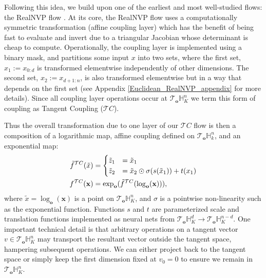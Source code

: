 Following this idea, we build upon one of the earliest and most well-studied flows: the RealNVP flow \cite{dinh2016density}. At its core, the RealNVP flow uses a computationally symmetric transformation (affine coupling layer) which has the benefit of being fast to evaluate and invert due to a triangular Jacobian whose determinant is cheap to compute. Operationally, the coupling layer is implemented using a binary mask, and partitions some input $x$ into two sets, where the first set, $x_1:=x_{0:d}$ is transformed elementwise independently of other dimensions. The second set, $x_2:=x_{d+1:n}$, is also transformed elementwise but in a way that depends on the first set (see Appendix \ref{Euclidean_RealNVP_appendix} for more details). Since all coupling layer operations occur at $\mathcal{T}_{\textbf{o}}\mathbb{H}^n_K$ we term this form of coupling as Tangent Coupling ($\mathcal{T}C$). 

Thus the overall transformation due to one layer of our $\mathcal{T}C$ flow is then a composition of a logarithmic map, affine coupling defined on $\mathcal{T}_{\textbf{o}}\mathbb{H}^n_k$, and an exponential map:
\begin{align}
    \label{eq:tangent_coupling}
     \tilde{f}^{\mathcal{T}C}(\tilde{x}) &=
     \begin{cases}
     \tilde{z}_{1} &= \tilde{x}_{1} \\
     \tilde{z}_{2} &= \tilde{x}_{2} \odot \sigma(s(\tilde{x}_{1})) + t(x_1) \nonumber
     \end{cases}\\
    f^{\mathcal{T}C}(\mathbf{x}) &= \textnormal{exp}_{\textbf{o}}(\tilde{f}^{\mathcal{T}C}(\log_{\textbf{o}}(\textbf{x}))),
\end{align}
where $\tilde{x} = \log_{\textbf{o}}(\textbf{x})$ is a point on $\mathcal{T}_{\textbf{o}}\mathbb{H}^n_K$, and $\sigma$ is a pointwise non-linearity such as the exponential function. Functions $s$ and $t$ are parameterized scale and translation functions implemented as neural nets from $\mathcal{T}_{\textbf{o}}\mathbb{H}^{d}_K \to \mathcal{T}_{\textbf{o}}\mathbb{H}^{n-d}_K$.
One important technical detail is that arbitrary operations on a tangent vector $v \in \mathcal{T}_{\textbf{o}}\mathbb{H}^n_K$ may transport the resultant vector outside the tangent space, hampering subsequent operations. We can either project back to the tangent space or simply keep the first dimension fixed at $v_0 = 0$ to ensure we remain in $\mathcal{T}_{\textbf{o}}\mathbb{H}^{n}_K$.

